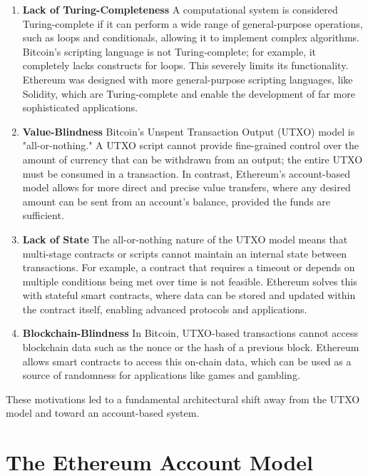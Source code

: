\documentclass{scrbook}
\begin{document}
\begin{enumerate}
    \item \textbf{Lack of Turing-Completeness} A computational system is considered Turing-complete if it can perform a wide range of general-purpose operations, such as loops and conditionals, allowing it to implement complex algorithms. Bitcoin’s scripting language is not Turing-complete; for example, it completely lacks constructs for loops. This severely limits its functionality. Ethereum was designed with more general-purpose scripting languages, like Solidity, which are Turing-complete and enable the development of far more sophisticated applications.
    
    \item \textbf{Value-Blindness} Bitcoin’s Unspent Transaction Output (UTXO) model is "all-or-nothing." A UTXO script cannot provide fine-grained control over the amount of currency that can be withdrawn from an output; the entire UTXO must be consumed in a transaction. In contrast, Ethereum's account-based model allows for more direct and precise value transfers, where any desired amount can be sent from an account's balance, provided the funds are sufficient.
    
    \item \textbf{Lack of State} The all-or-nothing nature of the UTXO model means that multi-stage contracts or scripts cannot maintain an internal state between transactions. For example, a contract that requires a timeout or depends on multiple conditions being met over time is not feasible. Ethereum solves this with stateful smart contracts, where data can be stored and updated within the contract itself, enabling advanced protocols and applications.
    
    \item \textbf{Blockchain-Blindness} In Bitcoin, UTXO-based transactions cannot access blockchain data such as the nonce or the hash of a previous block. Ethereum allows smart contracts to access this on-chain data, which can be used as a source of randomness for applications like games and gambling.
\end{enumerate}

These motivations led to a fundamental architectural shift away from the UTXO model and toward an account-based system.

\chapter{The Ethereum Account Model}
\end{document}
